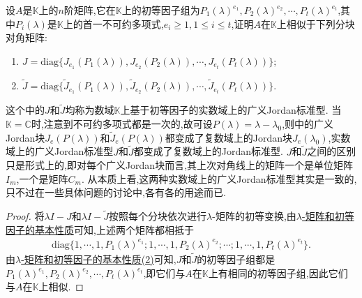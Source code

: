 \documentclass[../../main.tex]{subfiles}%
\begin{document}
\begin{proposition}\label{proposition:广义标准型理论相关结论1}
设$A$是$\mathbb{K}$上的$n$阶矩阵,它在$\mathbb{K}$上的初等因子组为$P_1(\lambda)^{e_1},P_2(\lambda)^{e_2},\cdots,P_t(\lambda)^{e_t}$,其中$P_i(\lambda)$是$\mathbb{K}$上的首一不可约多项式,$e_i\geqslant 1, 1\leqslant i\leqslant t$,证明$A$在$\mathbb{K}$上相似于下列分块对角矩阵:
\begin{enumerate}[(1)]
\item $J = \mathrm{diag}\{J_{e_1}(P_1(\lambda)),J_{e_2}(P_2(\lambda)),\cdots,J_{e_t}(P_t(\lambda))\};$

\item $\widetilde{J} = \mathrm{diag}\{\widetilde{J}_{e_1}(P_1(\lambda)),\widetilde{J}_{e_2}(P_2(\lambda)),\cdots,\widetilde{J}_{e_t}(P_t(\lambda))\}.$
\end{enumerate}
\end{proposition}
\begin{remark}
这个中的$J$和$\widetilde{J}$均称为数域$\mathbb{K}$上基于初等因子的实数域上的广义Jordan标准型. 当$\mathbb{K}=\mathbb{C}$时,注意到不可约多项式都是一次的,故可设$P(\lambda)=\lambda - \lambda_0$,则中的广义Jordan块$J_e(P(\lambda))$和$\widetilde{J}_e(P(\lambda))$都变成了复数域上的Jordan块$J_e(\lambda_0)$,实数域上的广义Jordan标准型$J$和$\widetilde{J}$都变成了复数域上的Jordan标准型. $J$和$\widetilde{J}$之间的区别只是形式上的,即对每个广义Jordan块而言,其上次对角线上的矩阵一个是单位矩阵$I_m$,一个是矩阵$C_m$. 从本质上看,这两种实数域上的广义Jordan标准型其实是一致的,只不过在一些具体问题的讨论中,各有各的用途而已. 
\end{remark}
\begin{proof}

将$\lambda I - J$和$\lambda I - \widetilde{J}$按照每个分块依次进行$\lambda$-矩阵的初等变换,由\hyperref[theorem:lambda-矩阵和初等因子的基本性质]{$\lambda$-矩阵和初等因子的基本性质}可知,上述两个矩阵都相抵于
\begin{align*}
\mathrm{diag}\{1,\cdots,1,P_1(\lambda)^{e_1};1,\cdots,1,P_2(\lambda)^{e_2};\cdots;1,\cdots,1,P_t(\lambda)^{e_t}\}.
\end{align*}
由\hyperref[theorem:lambda-矩阵和初等因子的基本性质]{$\lambda$-矩阵和初等因子的基本性质(2)}可知,$J$和$\widetilde{J}$的初等因子组都是$P_1(\lambda)^{e_1},P_2(\lambda)^{e_2},\cdots,P_t(\lambda)^{e_t}$,即它们与$A$在$\mathbb{K}$上有相同的初等因子组,因此它们与$A$在$\mathbb{K}$上相似. 

\end{proof}
\end{document}

